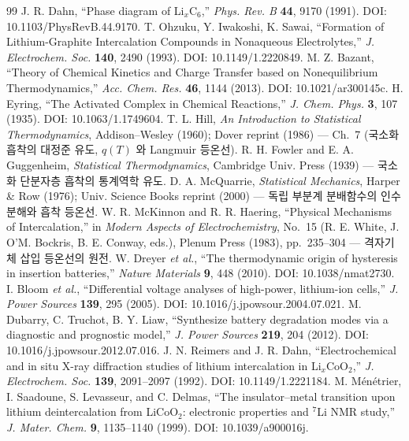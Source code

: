 \documentclass[11pt,a4paper]{article}
\begin{document}
\begin{thebibliography}{99}
 J. R. Dahn, ``Phase diagram of Li$_x$C$_6$,'' \emph{Phys. Rev. B} \textbf{44}, 9170 (1991). DOI: 10.1103/PhysRevB.44.9170.
 T. Ohzuku, Y. Iwakoshi, K. Sawai, ``Formation of Lithium-Graphite Intercalation Compounds in Nonaqueous Electrolytes,'' \emph{J. Electrochem. Soc.} \textbf{140}, 2490 (1993). DOI: 10.1149/1.2220849.
 M. Z. Bazant, ``Theory of Chemical Kinetics and Charge Transfer based on Nonequilibrium Thermodynamics,'' \emph{Acc. Chem. Res.} \textbf{46}, 1144 (2013). DOI: 10.1021/ar300145c.
 H. Eyring, ``The Activated Complex in Chemical Reactions,'' \emph{J. Chem. Phys.} \textbf{3}, 107 (1935). DOI: 10.1063/1.1749604.
 T. L. Hill, \emph{An Introduction to Statistical Thermodynamics}, Addison--Wesley (1960); Dover reprint (1986) --- Ch.~7 (국소화 흡착의 대정준 유도, $q(T)$ 와 Langmuir 등온선).
 R. H. Fowler and E. A. Guggenheim, \emph{Statistical Thermodynamics}, Cambridge Univ. Press (1939) --- 국소화 단분자층 흡착의 통계역학 유도.
 D. A. McQuarrie, \emph{Statistical Mechanics}, Harper \& Row (1976); Univ. Science Books reprint (2000) --- 독립 부분계 분배함수의 인수분해와 흡착 등온선.
 W. R. McKinnon and R. R. Haering, ``Physical Mechanisms of Intercalation,'' in \emph{Modern Aspects of Electrochemistry}, No.~15 (R. E. White, J. O'M. Bockris, B. E. Conway, eds.), Plenum Press (1983), pp.~235--304 --- 격자기체 삽입 등온선의 원전.
 W. Dreyer \emph{et al.}, ``The thermodynamic origin of hysteresis in insertion batteries,'' \emph{Nature Materials} \textbf{9}, 448 (2010). DOI: 10.1038/nmat2730.
 I. Bloom \emph{et al.}, ``Differential voltage analyses of high-power, lithium-ion cells,'' \emph{J. Power Sources} \textbf{139}, 295 (2005). DOI: 10.1016/j.jpowsour.2004.07.021.
 M. Dubarry, C. Truchot, B. Y. Liaw, ``Synthesize battery degradation modes via a diagnostic and prognostic model,'' \emph{J. Power Sources} \textbf{219}, 204 (2012). DOI: 10.1016/j.jpowsour.2012.07.016.
 J. N. Reimers and J. R. Dahn, ``Electrochemical and in situ X-ray diffraction studies of lithium intercalation in Li$_x$CoO$_2$,'' \emph{J. Electrochem. Soc.} \textbf{139}, 2091--2097 (1992). DOI: 10.1149/1.2221184.
 M. M\'en\'etrier, I. Saadoune, S. Levasseur, and C. Delmas, ``The insulator--metal transition upon lithium deintercalation from LiCoO$_2$: electronic properties and $^7$Li NMR study,'' \emph{J. Mater. Chem.} \textbf{9}, 1135--1140 (1999). DOI: 10.1039/a900016j.

\end{thebibliography}
\end{document}
